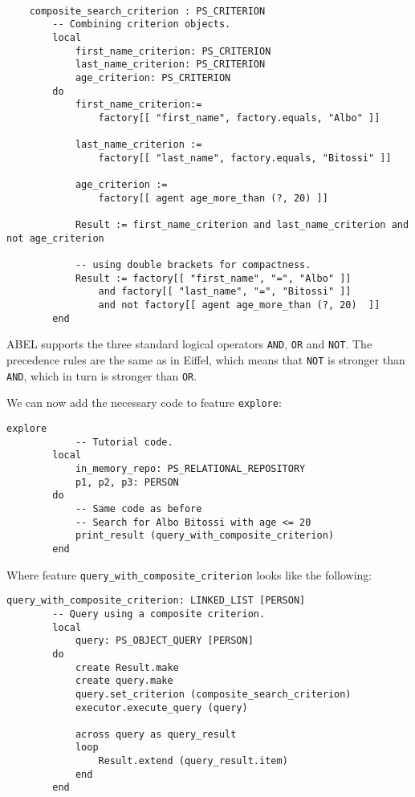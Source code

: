 \documentclass[a4paper,12pt]{report}
\begin{document}
\begin{lstlisting}[language=OOSC2Eiffel, captionpos=b, caption={Combining criteria.}, label={lst:search_albo_bitossi}]

	composite_search_criterion : PS_CRITERION
		-- Combining criterion objects.
		local
			first_name_criterion: PS_CRITERION
			last_name_criterion: PS_CRITERION
			age_criterion: PS_CRITERION
		do
			first_name_criterion:= 
				factory[[ "first_name", factory.equals, "Albo" ]]

			last_name_criterion := 
				factory[[ "last_name", factory.equals, "Bitossi" ]]

			age_criterion := 
				factory[[ agent age_more_than (?, 20) ]]
			
			Result := first_name_criterion and last_name_criterion and not age_criterion

			-- using double brackets for compactness. 
			Result := factory[[ "first_name", "=", "Albo" ]] 
				and factory[[ "last_name", "=", "Bitossi" ]] 
				and not factory[[ agent age_more_than (?, 20)  ]]
		end
\end{lstlisting}

ABEL supports the three standard logical operators \lstinline!AND!, \lstinline!OR! and \lstinline!NOT!. 
The precedence rules are the same as in Eiffel, which means that \lstinline!NOT! is stronger than \lstinline!AND!, which in turn is stronger than \lstinline!OR!.

We can now add the necessary code to feature \lstinline{explore}:  
\begin{lstlisting}[language=OOSC2Eiffel, captionpos=b, caption={Invoking the code that searches for Albo Bitossi}, label={lst:tutorial_print_result}]
	explore
			-- Tutorial code.
		local
			in_memory_repo: PS_RELATIONAL_REPOSITORY
			p1, p2, p3: PERSON
		do
			-- Same code as before
			-- Search for Albo Bitossi with age <= 20
			print_result (query_with_composite_criterion)
		end
\end{lstlisting}

Where feature \lstinline{query_with_composite_criterion} looks like the following:
\begin{lstlisting}[language=OOSC2Eiffel, captionpos=b, caption={Invoking the code that searches for Albo Bitossi}, label={lst:tutorial_print_result}]
	query_with_composite_criterion: LINKED_LIST [PERSON]
		-- Query using a composite criterion.
		local
			query: PS_OBJECT_QUERY [PERSON]
		do
			create Result.make
			create query.make
			query.set_criterion (composite_search_criterion)
			executor.execute_query (query)

			across query as	query_result
			loop
				Result.extend (query_result.item)
			end
		end
\end{lstlisting}
\end{document}
